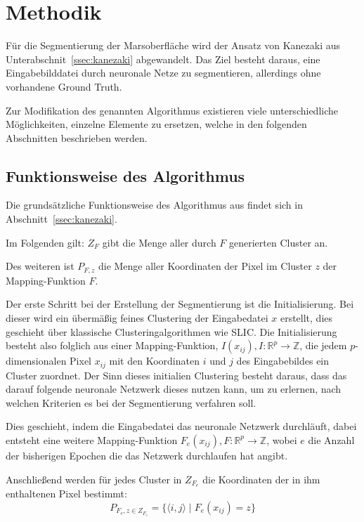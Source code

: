 \chapter{Methodik}
\label{chap:methodik}

Für die Segmentierung der Marsoberfläche wird der Ansatz von Kanezaki \etal \cite{kanezaki_18} aus Unterabschnit~\ref{ssec:kanezaki} abgewandelt. Das Ziel besteht daraus, eine Eingabebilddatei durch neuronale Netze zu segmentieren, allerdings ohne vorhandene Ground Truth.

Zur Modifikation des genannten Algorithmus existieren viele unterschiedliche Möglichkeiten, einzelne Elemente zu ersetzen, welche in den folgenden Abschnitten beschrieben werden.

\section{Funktionsweise des Algorithmus}
\label{sec:howitworks}

Die grundsätzliche Funktionsweise des Algorithmus aus \cite{kanezaki_18} findet sich in Abschnitt~\ref{ssec:kanezaki}. 

Im Folgenden gilt: $Z_F$ gibt die Menge aller durch $F$ generierten Cluster an.

Des weiteren ist $P_{F,z}$ die Menge aller Koordinaten der Pixel im Cluster $z$ der Mapping-Funktion $F$.

Der erste Schritt bei der Erstellung der Segmentierung ist die Initialisierung. Bei dieser wird ein übermäßig feines Clustering der Eingabedatei $x$ erstellt, dies geschieht über klassische Clusteringalgorithmen wie SLIC. Die Initialisierung besteht also folglich aus einer Mapping-Funktion, $I(x_{ij}), I: \mathbb{R}^p\rightarrow\mathbb{Z}$, die jedem $p$-dimensionalen Pixel $x_{ij}$ mit den Koordinaten $i$ und $j$ des Eingabebildes ein Cluster zuordnet. Der Sinn dieses initialien Clustering besteht daraus, dass das darauf folgende neuronale Netzwerk dieses nutzen kann, um zu erlernen, nach welchen Kriterien es bei der Segmentierung verfahren soll.

Dies geschieht, indem die Eingabedatei das neuronale Netzwerk durchläuft, dabei entsteht eine weitere Mapping-Funktion $F_e(x_{ij}), F: \mathbb{R}^p\rightarrow\mathbb{Z}$, wobei $e$ die Anzahl der bisherigen Epochen die das Netzwerk durchlaufen hat angibt.

Anschließend werden für jedes Cluster in $Z_{F_e}$  die Koordinaten der in ihm enthaltenen Pixel bestimmt:
\begin{equation}
P_{F_e,{z\in Z_{F_e}}} = \{\langle i, j\rangle\mid F_e(x_{ij}) = z\}
\end{equation}

